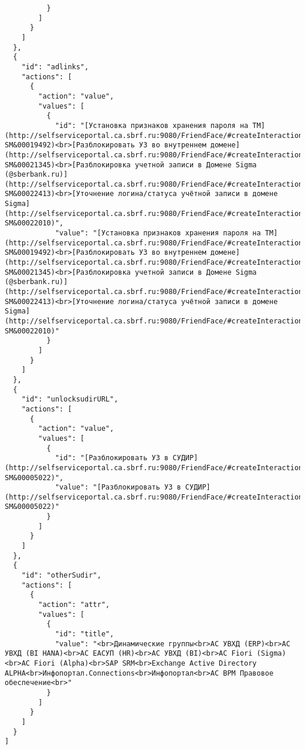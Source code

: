 \begin{verbatim}
          }
        ]
      }
    ]
  },
  {
    "id": "adlinks",
    "actions": [
      {
        "action": "value",
        "values": [
          {
            "id": "[Установка признаков хранения пароля на ТМ](http://selfserviceportal.ca.sbrf.ru:9080/FriendFace/#createInteraction?SM&00019492)<br>[Разблокировать УЗ во внутреннем домене](http://selfserviceportal.ca.sbrf.ru:9080/FriendFace/#createInteraction?SM&00021345)<br>[Разблокировка учетной записи в Домене Sigma (@sberbank.ru)](http://selfserviceportal.ca.sbrf.ru:9080/FriendFace/#createInteraction?SM&00022413)<br>[Уточнение логина/статуса учётной записи в домене Sigma](http://selfserviceportal.ca.sbrf.ru:9080/FriendFace/#createInteraction?SM&00022010)",
            "value": "[Установка признаков хранения пароля на ТМ](http://selfserviceportal.ca.sbrf.ru:9080/FriendFace/#createInteraction?SM&00019492)<br>[Разблокировать УЗ во внутреннем домене](http://selfserviceportal.ca.sbrf.ru:9080/FriendFace/#createInteraction?SM&00021345)<br>[Разблокировка учетной записи в Домене Sigma (@sberbank.ru)](http://selfserviceportal.ca.sbrf.ru:9080/FriendFace/#createInteraction?SM&00022413)<br>[Уточнение логина/статуса учётной записи в домене Sigma](http://selfserviceportal.ca.sbrf.ru:9080/FriendFace/#createInteraction?SM&00022010)"
          }
        ]
      }
    ]
  },
  {
    "id": "unlocksudirURL",
    "actions": [
      {
        "action": "value",
        "values": [
          {
            "id": "[Разблокировать УЗ в СУДИР](http://selfserviceportal.ca.sbrf.ru:9080/FriendFace/#createInteraction?SM&00005022)",
            "value": "[Разблокировать УЗ в СУДИР](http://selfserviceportal.ca.sbrf.ru:9080/FriendFace/#createInteraction?SM&00005022)"
          }
        ]
      }
    ]
  },
  {
    "id": "otherSudir",
    "actions": [
      {
        "action": "attr",
        "values": [
          {
            "id": "title",
            "value": "<br>Динамические группы<br>АС УВХД (ERP)<br>АС УВХД (BI HANA)<br>АС ЕАСУП (HR)<br>АС УВХД (BI)<br>АС Fiori (Sigma)<br>АС Fiori (Alpha)<br>SAP SRM<br>Exchange Active Directory ALPHA<br>Инфопортал.Connections<br>Инфопортал<br>АС BPM Правовое обеспечение<br>"
          }
        ]
      }
    ]
  }
]
\end{verbatim}